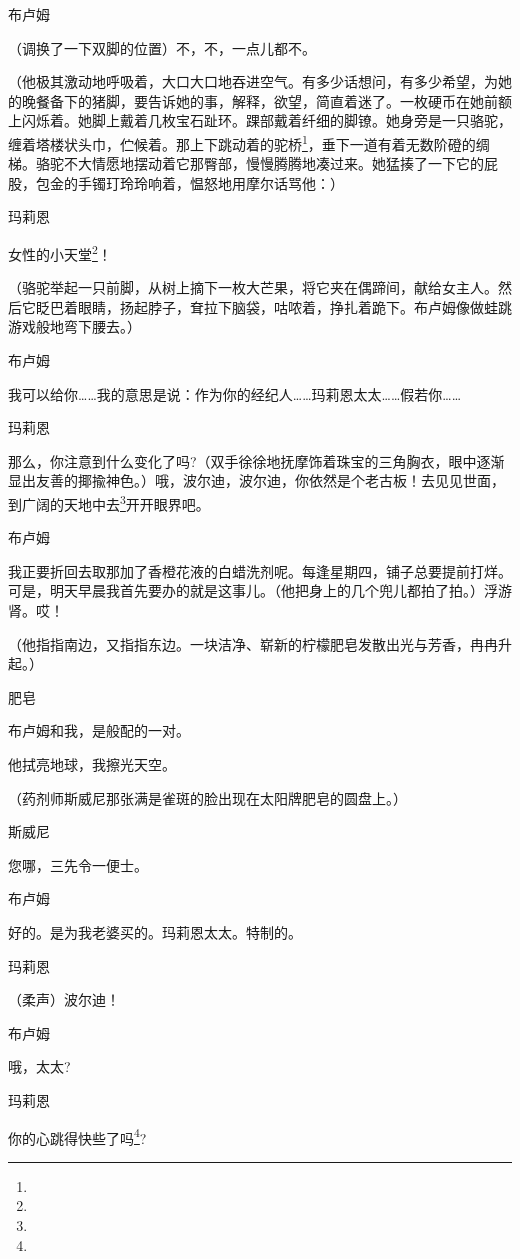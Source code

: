\par 布卢姆
\par （调换了一下双脚的位置）不，不，一点儿都不。
\par （他极其激动地呼吸着，大口大口地吞进空气。有多少话想问，有多少希望，为她的晚餐备下的猪脚，要告诉她的事，解释，欲望，简直着迷了。一枚硬币在她前额上闪烁着。她脚上戴着几枚宝石趾环。踝部戴着纤细的脚镣。她身旁是一只骆驼，缠着塔楼状头巾，伫候着。那上下跳动着的驼桥\footnote{}，垂下一道有着无数阶磴的绸梯。骆驼不大情愿地摆动着它那臀部，慢慢腾腾地凑过来。她猛揍了一下它的屁股，包金的手镯玎玲玲响着，愠怒地用摩尔话骂他：）
\par 玛莉恩
\par 女性的小天堂\footnote{}！
\par （骆驼举起一只前脚，从树上摘下一枚大芒果，将它夹在偶蹄间，献给女主人。然后它眨巴着眼睛，扬起脖子，耷拉下脑袋，咕哝着，挣扎着跪下。布卢姆像做蛙跳游戏般地弯下腰去。）
\par 布卢姆
\par 我可以给你……我的意思是说：作为你的经纪人……玛莉恩太太……假若你……
\par 玛莉恩
\par 那么，你注意到什么变化了吗?（双手徐徐地抚摩饰着珠宝的三角胸衣，眼中逐渐显出友善的揶揄神色。）哦，波尔迪，波尔迪，你依然是个老古板！去见见世面，到广阔的天地中去\footnote{}开开眼界吧。
\par 布卢姆
\par 我正要折回去取那加了香橙花液的白蜡洗剂呢。每逢星期四，铺子总要提前打烊。可是，明天早晨我首先要办的就是这事儿。（他把身上的几个兜儿都拍了拍。）浮游肾。哎！
\par （他指指南边，又指指东边。一块洁净、崭新的柠檬肥皂发散出光与芳香，冉冉升起。）
\par 肥皂
\par 布卢姆和我，是般配的一对。
\par 他拭亮地球，我擦光天空。
\par （药剂师斯威尼那张满是雀斑的脸出现在太阳牌肥皂的圆盘上。）
\par 斯威尼
\par 您哪，三先令一便士。
\par 布卢姆
\par 好的。是为我老婆买的。玛莉恩太太。特制的。
\par 玛莉恩
\par （柔声）波尔迪！
\par 布卢姆
\par 哦，太太?
\par 玛莉恩
\par 你的心跳得快些了吗\footnote{}?
